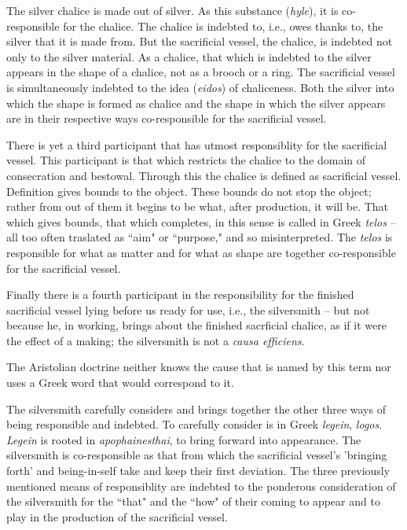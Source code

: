 The silver chalice is made out of silver. As this substance (\textit{hyle}), it is co-responsible for the chalice. The chalice is indebted to, i.e., owes thanks to, the silver that it is made from. But the sacrificial vessel, the chalice, is indebted not only to the silver material. As a chalice, that which is indebted to the silver appears in the shape of a chalice, not as a brooch or a ring. The sacrificial vessel is simultaneously indebted to the idea (\textit{eidos}) of chaliceness. Both the silver into which the shape is formed as chalice and the shape in which the silver appears are in their respective ways co-responsible for the sacrificial vessel.

There is yet a third participant that has utmost responsiblity for the sacrificial vessel. This participant is that which restricts the chalice to the domain of consecration and bestowal. Through this the chalice is defined as sacrificial vessel. Definition gives bounds to the object. These bounds do not stop the object; rather from out of them it begins to be what, after production, it will be. That which gives bounds, that which completes, in this sense is called in Greek \textit{telos} -- all too often traslated as ``aim" or ``purpose," and so misinterpreted. The \textit{telos} is responsible for what as matter and for what as shape are together co-responsible for the sacrificial vessel.

Finally there is a fourth participant in the responsibility for the finished sacrificial vessel lying before us ready for use, i.e., the silversmith -- but not because he, in working, brings about the finished sacrficial chalice, as if it were the effect of a making; the silversmith is not a \textit{causa efficiens}.

The Aristolian doctrine neither knows the cause that is named by this term nor uses a Greek word that would correspond to it.

The silversmith carefully considers and brings together the other three ways of being responsible and indebted. To carefully consider is in Greek \textit{legein}, \textit{logos}. \textit{Legein} is rooted in \textit{apophainesthai}, to bring forward into appearance. The silversmith is co-responsible as that from which the sacrificial vessel's 'bringing forth' and being-in-self take and keep their first deviation. The three previously mentioned means of responsiblity are indebted to the ponderous consideration of the silversmith for the ``that" and the ``how" of their coming to appear and to play in the production of the sacrificial vessel.

